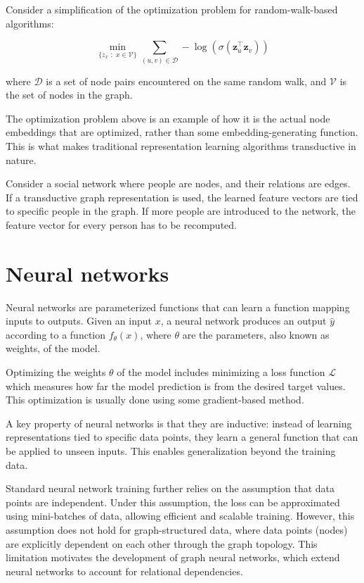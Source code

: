 \documentclass[PhD,single]{uclathes}
\begin{document}
Consider a simplification of the optimization problem for random-walk-based
algorithms:

\[
\min_{\{z_x \,\,: \,\,x \in \mathcal{V} \}}
\sum_{(u,v)\in\mathcal{D}}
-\log\left(\sigma(\mathbf{z}_u^\top \mathbf{z}_v)\right)
\]

where $\mathcal{D}$ is a set of node pairs encountered on the same random walk,
and $\mathcal{V}$ is the set of nodes in the graph.

The optimization problem above is an example of how it is the actual node
embeddings that are optimized, rather than some embedding-generating function.
This is what makes traditional representation learning algorithms transductive
in nature.

Consider a social network where people are nodes, and their relations are
edges. If a transductive graph representation is used, the learned feature
vectors are tied to specific people in the graph. If more people are introduced
to the network, the feature vector for every person has to be recomputed.

\section{Neural networks}
Neural networks are parameterized functions that can learn a function mapping
inputs to outputs. Given an input $x$, a neural network produces an output
$\hat{y}$ according to a function $f_{\theta}(x)$, where $\theta$ are the
parameters, also known as weights, of the model.

Optimizing the weights $\theta$ of the model includes minimizing a loss
function $\mathcal{L}$ which measures how far the model prediction is from the
desired target values. This optimization is usually done using some
gradient-based method.

A key property of neural networks is that they are inductive: instead of
learning representations tied to specific data points, they learn a general
function that can be applied to unseen inputs. This enables generalization
beyond the training data.

Standard neural network training further relies on the assumption that data
points are independent. Under this assumption, the loss can be approximated
using mini-batches of data, allowing efficient and scalable training. However,
this assumption does not hold for graph-structured data, where data points
(nodes) are explicitly dependent on each other through the graph topology. This
limitation motivates the development of graph neural networks, which extend
neural networks to account for relational dependencies.
\end{document}
